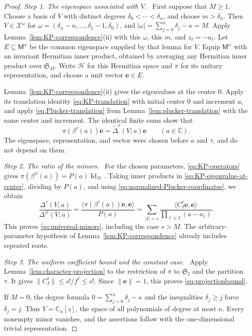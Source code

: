 \documentclass[11pt,letterpaper,reqno]{amsart}
\theoremstyle{remark}
\numberwithin{equation}{section}
\newcommand{\C}{\mathbb C}
\newcommand{\ev}{\bm e}
\newcommand{\step}[1]{\medskip\noindent\emph{#1}\ }
\begin{document}
\begin{proof}
\step{Step 1. The eigenspace associated with $V$.}
First suppose that $M\geq1$. Choose a basis of $V$ with distinct degrees
$\delta_0<\cdots<\delta_n$, and choose $m>\delta_n$. Then
$V\in\mathcal X^\omega$ for
$\omega=(\delta_n-n,\ldots,\delta_1-1,\delta_0)$, and
$|\omega|=\sum_{j=0}^n\delta_j-\kappa=M$.
Apply Lemma~\ref{lem:KP-correspondence}(ii) with this $\omega$, this $m$,
and $z_\ell=-a_\ell$. Let $E\subseteq\mathsf M^\omega$ be the common
eigenspace supplied by that lemma for $V$. Equip $\mathsf M^\omega$ with
an invariant Hermitian inner product, obtained by averaging any Hermitian
inner product over $\mathfrak S_M$. Write $\mathcal H$ for this Hermitian
space and $\pi$ for its unitary representation, and choose a unit vector
$\ev\in E$.

Lemma~\ref{lem:KP-correspondence}(ii) gives the eigenvalues at the center
$0$. Apply its translation identity \eqref{eq:KP-translation} with initial
center $0$ and increment $a$, and apply \eqref{eq:Plucker-translation}
from Lemma~\ref{lem:plucker-translation} with the same center and increment.
The identical finite sums show that
\begin{equation}\label{eq:KP-eigenvalue-at-center}
 \pi(\beta^\tau(a))\ev
 =\widetilde\Delta^\tau(V;a)\ev
 \qquad(a\in\C).
\end{equation}
The eigenspace, representation, and vector were chosen before $a$ and
$\tau$, and do not depend on them.

\step{Step 2. The ratio of the minors.}
For the chosen parameters, \eqref{eq:KP-operators} gives
$\pi(\beta^\varnothing(a))=P(a)\operatorname{Id}_{\mathcal H}$.
Taking inner products in \eqref{eq:KP-eigenvalue-at-center}, dividing by
$P(a)$, and using \eqref{eq:normalized-Plucker-coordinates}, we obtain
\[
 \frac{\Delta^\tau(V;a)}{\Delta^\varnothing(V;a)}
 =\frac{\langle\pi(\beta^\tau(a))\ev,\ev\rangle}{P(a)}
 =\sum_{|I|=s}
   \frac{\langle C_I^\tau\ev,\ev\rangle}
        {\prod_{\ell\in I}(a-a_\ell)}.
\]
This proves \eqref{eq:universal-minors}, including the case $s>M$.
The arbitrary-parameter hypothesis of Lemma~\ref{lem:KP-correspondence}
already includes repeated roots.

\step{Step 3. The uniform coefficient bound and the constant case.}
Apply Lemma~\ref{lem:character-projection} to the restriction of $\pi$ to
$\mathfrak S_I$ and the partition $\tau$. It gives
$\|C_I^\tau\|\leq s!/f^\tau\leq s!$. Since $\|\ev\|=1$, this proves
\eqref{eq:projectionbound}.

If $M=0$, the degree formula
$0=\sum_{j=0}^n\delta_j-\kappa$ and the inequalities $\delta_j\geq j$
force $\delta_j=j$. Thus $V=\C_n[z]$, the space of all polynomials of
degree at most $n$. Every nonempty minor vanishes, and the assertions
follow with the one-dimensional trivial representation.
\end{proof}
\end{document}

